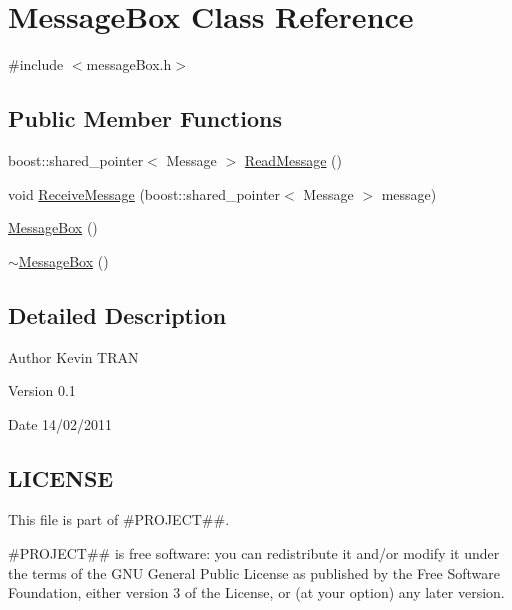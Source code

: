\hypertarget{classMessageBox}{
\section{MessageBox Class Reference}
\label{d2/da3/classMessageBox}
}


{\ttfamily \#include $<$messageBox.h$>$}

\subsection*{Public Member Functions}
\begin{DoxyCompactItemize}
\item 
boost::shared\_\-pointer$<$ Message $>$ \hyperlink{classMessageBox_aea4614d2371b253e2e96f602bdd9c557}{ReadMessage} ()
\item 
void \hyperlink{classMessageBox_a26aab3fd74f9d025664448cef1fff9c0}{ReceiveMessage} (boost::shared\_\-pointer$<$ Message $>$ message)
\item 
\hyperlink{classMessageBox_adb0c3df8b7a04a515456f0f2bf47321b}{MessageBox} ()
\item 
\hyperlink{classMessageBox_a1db265f45271916de44a4f500ccc566d}{$\sim$MessageBox} ()
\end{DoxyCompactItemize}


\subsection{Detailed Description}
\begin{DoxyAuthor}{Author}
Kevin TRAN 
\end{DoxyAuthor}
\begin{DoxyVersion}{Version}
0.1 
\end{DoxyVersion}
\begin{DoxyDate}{Date}
14/02/2011 
\end{DoxyDate}
\hypertarget{d6/d40/classThread_3_01TM_01_4_LICENSE}{}\subsection{LICENSE}\label{d6/d40/classThread_3_01TM_01_4_LICENSE}
This file is part of \#PROJECT\#\#.

\#PROJECT\#\# is free software: you can redistribute it and/or modify it under the terms of the GNU General Public License as published by the Free Software Foundation, either version 3 of the License, or (at your option) any later version.

